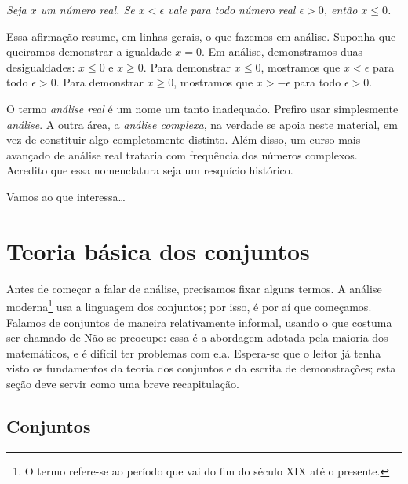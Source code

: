 \medskip

\emph{Seja $x$ um número real. Se $x < \epsilon$ vale para todo número real
$\epsilon > 0$, então $x \leq 0$.}

\medskip

Essa afirmação resume, em linhas gerais, o que fazemos em análise.
Suponha que queiramos demonstrar a igualdade $x = 0$. Em análise,
demonstramos duas desigualdades: $x \leq 0$ e $x \geq 0$.
Para demonstrar $x \leq 0$, mostramos que $x < \epsilon$ para todo
$\epsilon > 0$.
Para demonstrar $x \geq 0$, mostramos que $x > -\epsilon$ para todo
$\epsilon > 0$.

\medskip

O termo \emph{análise real} é um nome um tanto inadequado. Prefiro usar
simplesmente \emph{análise}. A outra área, a \emph{análise complexa}, na
verdade se apoia neste material, em vez de constituir algo completamente
distinto. Além disso, um curso mais avançado de análise real trataria com
frequência dos números complexos.
Acredito que essa nomenclatura seja um resquício histórico.

\medskip

Vamos ao que interessa\ldots



\sectionnewpage
\section{Teoria básica dos conjuntos} \label{sec:basicset}



Antes de começar a falar de análise, precisamos fixar alguns termos.
A análise moderna\footnote{O termo  refere-se ao período
que vai do fim do século XIX até o presente.} usa a linguagem dos conjuntos;
por isso, é por aí que começamos.
Falamos de conjuntos de maneira relativamente informal, usando o que costuma
ser chamado de  Não se
preocupe: essa é a abordagem adotada pela maioria dos matemáticos, e é difícil
ter problemas com ela.
Espera-se que o leitor já tenha visto os fundamentos da teoria dos conjuntos
e da escrita de demonstrações; esta seção deve servir como uma breve
recapitulação.

\subsection{Conjuntos}

